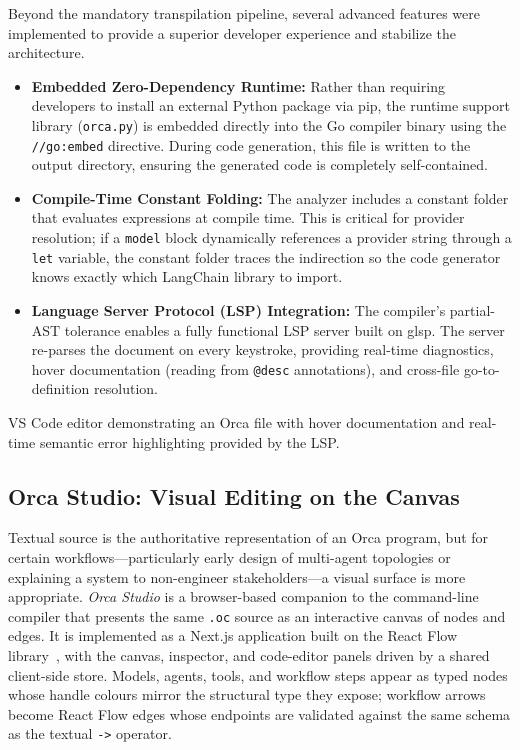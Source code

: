 \documentclass[sigconf,nonacm]{acmart}
\begin{document}
Beyond the mandatory transpilation pipeline, several advanced features were
implemented to provide a superior developer experience and stabilize the
architecture.
\begin{itemize}[leftmargin=*]
  \item \textbf{Embedded Zero-Dependency Runtime:} Rather than requiring
        developers to install an external Python package via pip, the
        runtime support library (\texttt{orca.py}) is embedded directly into
        the Go compiler binary using the \texttt{//go:embed} directive.
        During code generation, this file is written to the output directory,
        ensuring the generated code is completely self-contained.
  \item \textbf{Compile-Time Constant Folding:} The analyzer includes a
        constant folder that evaluates expressions at compile time. This is
        critical for provider resolution; if a \texttt{model} block
        dynamically references a provider string through a \texttt{let}
        variable, the constant folder traces the indirection so the code
        generator knows exactly which LangChain library to import.
  \item \textbf{Language Server Protocol (LSP) Integration:} The compiler's
        partial-AST tolerance enables a fully functional LSP server built on
        glsp. The server re-parses the document on every keystroke,
        providing real-time diagnostics, hover documentation (reading from
        \texttt{@desc} annotations), and cross-file go-to-definition
        resolution.
\end{itemize}

\begin{imgplaceholder}[title={Screenshot: Orca in VS Code}]
VS Code editor demonstrating an Orca file with hover documentation and
real-time semantic error highlighting provided by the LSP.
\end{imgplaceholder}

\subsection{Orca Studio: Visual Editing on the Canvas}
\label{sec:implementation:studio}

Textual source is the authoritative representation of an Orca program, but
for certain workflows---particularly early design of multi-agent topologies
or explaining a system to non-engineer stakeholders---a visual surface is
more appropriate. \emph{Orca Studio} is a browser-based companion to the
command-line compiler that presents the same \texttt{.oc} source as an
interactive canvas of nodes and edges. It is implemented as a Next.js
application built on the React Flow library~\cite{reactflow}, with the
canvas, inspector, and code-editor panels driven by a shared client-side
store. Models, agents, tools, and workflow steps appear as typed nodes
whose handle colours mirror the structural type they expose; workflow
arrows become React Flow edges whose endpoints are validated against the
same schema as the textual \texttt{->} operator.
\end{document}
